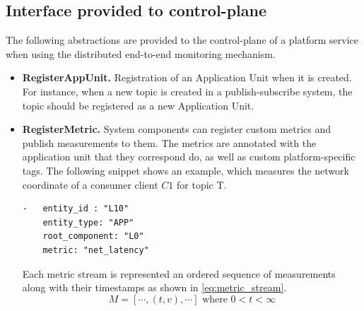 
\subsection{Interface provided to control-plane}
The following abstractions are provided to the control-plane of a platform service when using the distributed end-to-end monitoring mechanism.
\begin{itemize}
\item \textbf{RegisterAppUnit.} Registration of an Application Unit when it is created. For instance, when a new topic is created in a publish-subscribe system, the topic should be registered as a new Application Unit.
\item \textbf{RegisterMetric.} System components can register custom metrics and publish measurements to them. The metrics are annotated with the application unit that they correspond do, as well as custom platform-specific tags. The following snippet shows an example, which measures the network coordinate of a consumer client $C1$ for topic T.
\begin{verbatim}
-   entity_id : "L10"
    entity_type: "APP"
    root_component: "L0"
    metric: "net_latency"
\end{verbatim}
Each metric stream is represented an ordered sequence of measurements along with their timestamps as shown in \cref{eq:metric_stream}.
\begin{equation}
M = \left[ \cdots , \left( t, v \right) , \cdots \right] \text{ where } 0 < t < \infty
\label{eq:metric_stream}
\end{equation}


\end{itemize}
